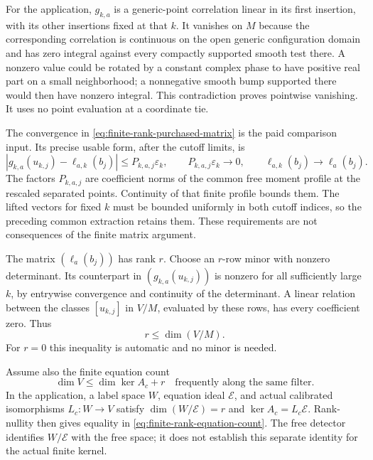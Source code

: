 For the application, $g_{k,a}$ is a generic-point correlation linear in
its first insertion, with its other insertions fixed at that $k$.
It vanishes on $M$ because the corresponding correlation is continuous
on the open generic configuration domain and has zero integral against
every compactly supported smooth test there. A nonzero value could be
rotated by a constant complex phase to have positive real part on a
small neighborhood; a nonnegative smooth bump supported there would
then have nonzero integral. This contradiction proves pointwise
vanishing. It uses no point evaluation at a coordinate tie.

The convergence in \eqref{eq:finite-rank-purchased-matrix} is the paid
comparison input. Its precise usable form, after the cutoff limits, is
\[
 |g_{k,a}(u_{k,j})-\ell_{a,k}(b_j)|\le P_{k,a,j}\varepsilon_k,
 \qquad P_{k,a,j}\varepsilon_k\to0,
 \qquad \ell_{a,k}(b_j)\to\ell_a(b_j).
\]
The factors $P_{k,a,j}$ are coefficient norms of the common free moment
profile at the rescaled separated points. Continuity of that finite
profile bounds them. The lifted vectors for fixed $k$ must be bounded
uniformly in both cutoff indices, so the preceding common extraction
retains them. These requirements are not consequences of the finite
matrix argument.

The matrix $(\ell_a(b_j))$ has rank $r$. Choose an $r$-row minor with
nonzero determinant. Its counterpart in $(g_{k,a}(u_{k,j}))$ is nonzero
for all sufficiently large $k$, by entrywise convergence and continuity
of the determinant. A linear relation between the classes $[u_{k,j}]$
in $V/M$, evaluated by these rows, has every coefficient zero. Thus
\begin{equation}\label{eq:finite-rank-lower-dimension}
                              r\le\dim(V/M).
\end{equation}
For $r=0$ this inequality is automatic and no minor is needed.

Assume also the finite equation count
\begin{equation}\label{eq:finite-rank-equation-count}
           \dim V\le\dim\ker A_c+r
           \quad\text{frequently along the same filter}.
\end{equation}
In the application, a label space $W$, equation ideal $\mathcal E$,
and actual calibrated isomorphisms $L_c:W\to V$ satisfy
$\dim(W/\mathcal E)=r$ and $\ker A_c=L_c\mathcal E$. Rank-nullity
then gives equality in \eqref{eq:finite-rank-equation-count}. The free
detector identifies $W/\mathcal E$ with the free space; it does not
establish this separate identity for the actual finite kernel.

